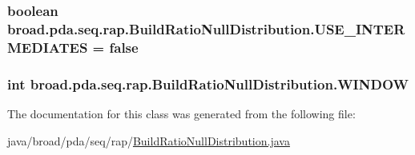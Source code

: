 \hypertarget{classbroad_1_1pda_1_1seq_1_1rap_1_1_build_ratio_null_distribution_a6ea0b8932123923712855a17a0f35d8f}{
\subsubsection[{U\+S\+E\+\_\+\+I\+N\+T\+E\+R\+M\+E\+D\+I\+A\+T\+E\+S}]{\setlength{\rightskip}{0pt plus 5cm}boolean broad.\+pda.\+seq.\+rap.\+Build\+Ratio\+Null\+Distribution.\+U\+S\+E\+\_\+\+I\+N\+T\+E\+R\+M\+E\+D\+I\+A\+T\+E\+S = false}}\label{classbroad_1_1pda_1_1seq_1_1rap_1_1_build_ratio_null_distribution_a6ea0b8932123923712855a17a0f35d8f}
\hypertarget{classbroad_1_1pda_1_1seq_1_1rap_1_1_build_ratio_null_distribution_a48fd3b10fc361eb5fb5b903b53a2fba1}{
\subsubsection[{W\+I\+N\+D\+O\+W}]{\setlength{\rightskip}{0pt plus 5cm}int broad.\+pda.\+seq.\+rap.\+Build\+Ratio\+Null\+Distribution.\+W\+I\+N\+D\+O\+W}}\label{classbroad_1_1pda_1_1seq_1_1rap_1_1_build_ratio_null_distribution_a48fd3b10fc361eb5fb5b903b53a2fba1}


The documentation for this class was generated from the following file\+:\begin{DoxyCompactItemize}
\item 
java/broad/pda/seq/rap/\hyperlink{_build_ratio_null_distribution_8java}{Build\+Ratio\+Null\+Distribution.\+java}\end{DoxyCompactItemize}
